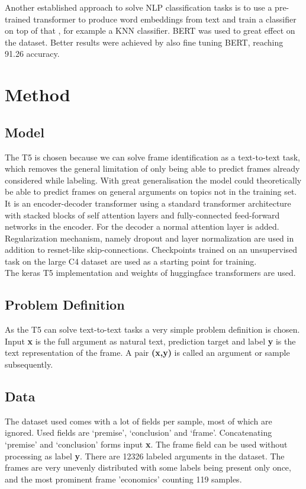\documentclass[11pt,a4paper,onecolumn,oneside,notitlepage]{article}
\begin{document}
Another established approach to solve  NLP classification tasks is to use a pre-trained transformer to produce word embeddings from text and train a classifier on top of that , for example a KNN classifier. BERT was used\citep{bert_frame_ident} to great effect on the \citep{bert_dataset} dataset. Better results were achieved by also fine tuning BERT, reaching \num{91.26} accuracy.  


\section{Method}
\label{method}

\subsection{Model}
The T5 is chosen because we can solve frame identification as a text-to-text task, which removes the general limitation of only being able to predict frames already considered while labeling. With great generalisation the model could theoretically be able to predict frames on general arguments on topics not in the training set. It is an encoder-decoder transformer using a standard transformer architecture with stacked blocks of  self attention layers and fully-connected feed-forward networks in the encoder. For the decoder a normal attention layer is added. Regularization mechanism, namely dropout and layer normalization are used in addition to resnet-like skip-connections.\citep{T5} Checkpoints trained on an unsupervised task on the large C4 dataset are used as a starting point for training.\\

The keras\citep{keras} T5 implementation and weights of huggingface transformers \citep{wolf-etal-2020-transformers} are used.


\subsection{Problem Definition}
\label{pd}
As the T5 can solve text-to-text tasks a very simple problem definition is chosen. Input \textbf{x} is the full argument as natural text, prediction target and label \textbf{y} is the text representation of the frame. A pair \textbf{(x,y)} is called an argument or sample subsequently. 
\subsection{Data}
The dataset used \citep{webis_task_paper}  comes with a lot of fields per sample, most of which are ignored. Used fields are ‘premise’, ‘conclusion’ and ‘frame’. Concatenating ‘premise’ and ‘conclusion’ forms input \textbf{x}. The frame field can be used without processing as label \textbf{y}. There are \num{12326} labeled arguments in the dataset. The frames are very unevenly distributed with some labels being present only once, and the most prominent frame 'economics' counting 119 samples.
\end{document}
